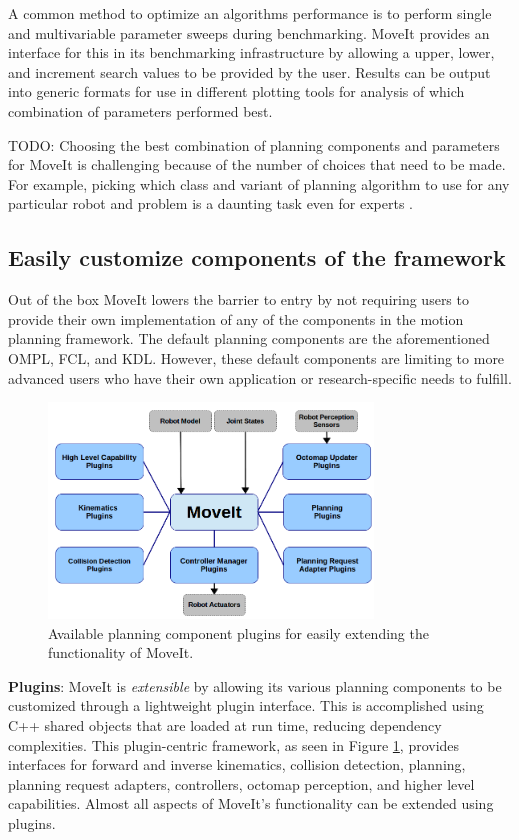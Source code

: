 \documentclass[10pt,journal,compsoc]{joser1}
\begin{document}
{A common method to optimize an algorithms performance is to perform single and multivariable parameter sweeps during benchmarking. MoveIt provides an interface for this in its benchmarking infrastructure by allowing a upper, lower, and increment search values to be provided by the user. Results can be output into generic formats for use in different plotting tools for analysis of which combination of parameters performed best.

TODO:
Choosing the best combination of planning components and parameters for MoveIt is challenging because of the number of choices that need to be made. For example, picking which class and variant of planning algorithm to use for any particular robot and problem is a daunting task even for experts \cite{cohen2012generic}.

\subsection{Easily customize components of the framework}
\label{subsec:extensiblity}

Out of the box MoveIt lowers the barrier to entry by not requiring users to provide their own implementation of any of the components in the motion planning framework. The default planning components are the aforementioned OMPL, FCL, and KDL. However, these default components are limiting to more advanced users who have their own application or research-specific needs to fulfill. 

\begin{figure}[!t]
\centering
\includegraphics[width=3.4in]{images/moveit_plugins}
\caption{Available planning component plugins for easily extending the functionality of MoveIt.}
\label{fig:moveit_plugins}
\end{figure}

{\bf Plugins}: MoveIt is \textit{extensible} by allowing its various planning components to be customized through a lightweight plugin interface. This is accomplished using C++ shared objects that are loaded at run time, reducing dependency complexities. This plugin-centric framework, as seen in Figure \ref{fig:moveit_plugins}, provides interfaces for forward and inverse kinematics, collision detection, planning, planning request adapters, controllers, octomap perception, and higher level capabilities. Almost all aspects of MoveIt's functionality can be extended using plugins.

}
\end{document}
